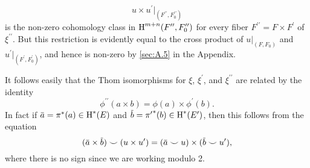 \documentclass[../main]{subfiles}
\begin{document}
\begin{enumerate}
\[
u \times u^{\prime} |_{(F^{\prime \prime}, F_{0}^{\prime \prime})}
\]
is the non-zero cohomology class in $\operatorname{H}^{m+ n }(F^{\prime \prime}, F_{0}^{\prime \prime})$ for every fiber \newline$F^{\prime \prime}=F \times F^{\prime}$ of $\xi^{\prime \prime}$. But this restriction is evidently equal to the cross product of $u|_{(F, F_{0})}$ and $u^{\prime} |_{(F^{\prime}, F_{0}^{\prime})}$, and hence is non-zero by \ref{sec:A.5} in the Appendix.

It follows easily that the Thom isomorphisms for $\xi$, $\xi^{\prime}$, and $\xi^{\prime \prime}$ are related by the identity
\[
\phi^{\prime \prime}(a \times b)=\phi(a) \times \phi^{\prime}(b).
\]
In fact if $\xoverline{a}=\pi^{*}(a) \in \homology^{*}(\total)$ and $\xoverline{b}={\pi^{\prime}}^*(b) \in \homology^{*}(\total^{\prime})$, then this follows from the equation
\[
(\xoverline{a} \times \xoverline{b}) \smile(u \times u^{\prime})=(\xoverline{a} \smile u) \times(\xoverline{b} \smile u^{\prime}),
\]
where there is no sign since we are working modulo 2.


\end{enumerate}
\end{document}
